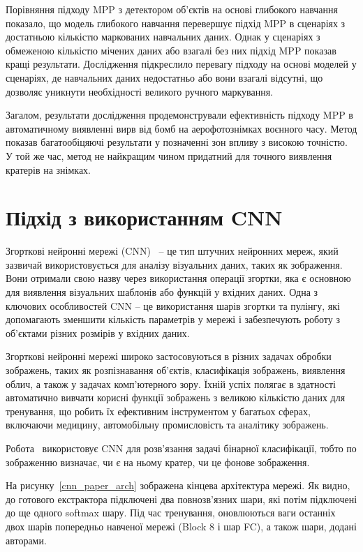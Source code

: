 Порівняння підходу MPP з детектором об'єктів на основі
глибокого навчання показало, що модель глибокого
навчання перевершує підхід MPP в сценаріях з достатньою
кількістю маркованих навчальних даних. Однак у сценаріях
з обмеженою кількістю мічених даних або взагалі без них
підхід MPP показав кращі результати. Дослідження підкреслило
перевагу підходу на основі моделей у сценаріях, де навчальних
даних недостатньо або вони взагалі відсутні, що дозволяє
уникнути необхідності великого ручного маркування.

Загалом, результати дослідження продемонстрували ефективність
підходу MPP в автоматичному виявленні вирв від бомб на
аерофотознімках воєнного часу. Метод показав багатообіцяючі
результати у позначенні зон впливу з високою точністю.
У той же час, метод не найкращим чином придатний для точного
виявлення кратерів на знімках.

\section{Підхід з використанням CNN}

Згорткові нейронні мережі (CNN)~\cite{oshea2015} -- це тип штучних
нейронних мереж,
який зазвичай використовується для аналізу візуальних даних,
таких як зображення. Вони отримали свою назву
через використання операції згортки, яка є основною
для виявлення візуальних шаблонів або функцій у вхідних даних.
Одна з ключових особливостей CNN -- це використання шарів згортки
та пулінгу, які допомагають зменшити кількість параметрів у мережі
і забезпечують роботу з об'єктами різних розмірів у вхідних даних.

Згорткові нейронні мережі широко застосовуються в різних задачах
обробки зображень, таких як розпізнавання об'єктів, класифікація
зображень, виявлення облич, а також у задачах комп'ютерного зору.
Їхній успіх полягає в здатності автоматично вивчати корисні функції
зображень з великою кількістю даних для тренування, що робить їх
ефективним інструментом у багатьох сферах, включаючи медицину,
автомобільну промисловість та аналітику зображень.

Робота~\cite{clermont2019} використовує CNN для розв'язання задачі
бінарної класифікації, тобто по зображенню визначає, чи є на ньому кратер,
чи це фонове зображення.

На рисунку~\ref{cnn_paper_arch} зображена кінцева архітектура мережі. Як видно,
до готового екстрактора підключені два повнозв'язних шари, які потім підключені
до ще одного softmax шару. Під час тренування, оновлюються ваги останніх двох
шарів попередньо навченої мережі (Block 8 і шар FC), а також шари, додані
авторами.

